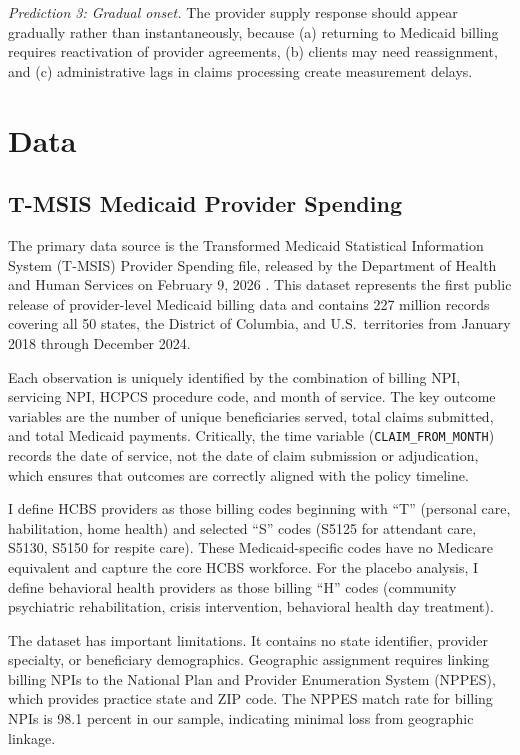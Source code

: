 \documentclass[12pt]{article}
\begin{document}
\textit{Prediction 3: Gradual onset.} The provider supply response should appear gradually rather than instantaneously, because (a) returning to Medicaid billing requires reactivation of provider agreements, (b) clients may need reassignment, and (c) administrative lags in claims processing create measurement delays.


\section{Data}

\subsection{T-MSIS Medicaid Provider Spending}

The primary data source is the Transformed Medicaid Statistical Information System (T-MSIS) Provider Spending file, released by the Department of Health and Human Services on February 9, 2026 \citep{hhs2026}. This dataset represents the first public release of provider-level Medicaid billing data and contains 227 million records covering all 50 states, the District of Columbia, and U.S.\ territories from January 2018 through December 2024.

Each observation is uniquely identified by the combination of billing NPI, servicing NPI, HCPCS procedure code, and month of service. The key outcome variables are the number of unique beneficiaries served, total claims submitted, and total Medicaid payments. Critically, the time variable (\texttt{CLAIM\_FROM\_MONTH}) records the date of service, not the date of claim submission or adjudication, which ensures that outcomes are correctly aligned with the policy timeline.

I define HCBS providers as those billing codes beginning with ``T'' (personal care, habilitation, home health) and selected ``S'' codes (S5125 for attendant care, S5130, S5150 for respite care). These Medicaid-specific codes have no Medicare equivalent and capture the core HCBS workforce. For the placebo analysis, I define behavioral health providers as those billing ``H'' codes (community psychiatric rehabilitation, crisis intervention, behavioral health day treatment).

The dataset has important limitations. It contains no state identifier, provider specialty, or beneficiary demographics. Geographic assignment requires linking billing NPIs to the National Plan and Provider Enumeration System (NPPES), which provides practice state and ZIP code. The NPPES match rate for billing NPIs is 98.1 percent in our sample, indicating minimal loss from geographic linkage.
\end{document}

